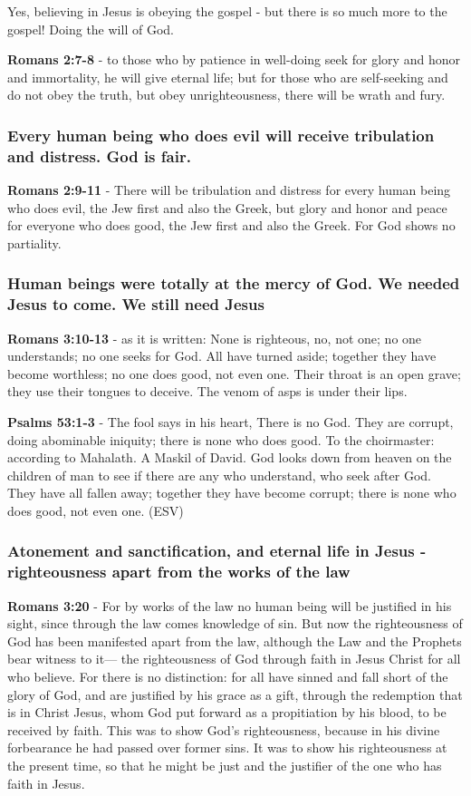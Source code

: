 \documentclass[11pt]{article}
\begin{document}
Yes, believing in Jesus is obeying the gospel - but there is so much more to the gospel! Doing the will of God.

\textbf{Romans 2:7-8} - to those who by patience in well-doing seek for glory and honor and immortality, he will give eternal life; but for those who are self-seeking and do not obey the truth, but obey unrighteousness, there will be wrath and fury.

\subsubsection{Every human being who does evil will receive tribulation and distress. God is fair.}
\label{sec:org1f60317}
\textbf{Romans 2:9-11} - There will be tribulation and distress for every human being who does evil, the Jew first and also the Greek, but glory and honor and peace for everyone who does good, the Jew first and also the Greek. For God shows no partiality.

\subsubsection{Human beings were totally at the mercy of God. We needed Jesus to come. We still need Jesus}
\label{sec:orgf1198a9}
\textbf{Romans 3:10-13} - as it is written: None is righteous, no, not one; no one understands; no one seeks for God.  All have turned aside; together they have become worthless; no one does good, not even one.  Their throat is an open grave; they use their tongues to deceive. The venom of asps is under their lips.

\textbf{Psalms 53:1-3} -  The fool says in his heart, There is no God.  They are corrupt, doing abominable iniquity; there is none who does good.  To the choirmaster: according to Mahalath.  A Maskil of David.  God looks down from heaven on the children of man to see if there are any who understand, who seek after God.  They have all fallen away; together they have become corrupt; there is none who does good, not even one.  (ESV)

\subsubsection{Atonement and sanctification, and eternal life in Jesus - righteousness apart from the works of the law}
\label{sec:org765d6c0}
\textbf{Romans 3:20} - For by works of the law no human being will be justified in his sight, since through the law comes knowledge of sin.  But now the righteousness of God has been manifested apart from the law, although the Law and the Prophets bear witness to it— the righteousness of God through faith in Jesus Christ for all who believe. For there is no distinction: for all have sinned and fall short of the glory of God, and are justified by his grace as a gift, through the redemption that is in Christ Jesus, whom God put forward as a propitiation by his blood, to be received by faith. This was to show God's righteousness, because in his divine forbearance he had passed over former sins.  It was to show his righteousness at the present time, so that he might be just and the justifier of the one who has faith in Jesus.
\end{document}
